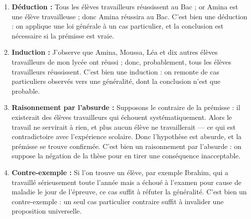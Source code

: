 \documentclass[11pt]{article}
\begin{document}
\begin{corrige}
\begin{enumerate}
\item \textbf{Déduction :} Tous les élèves travailleurs réussissent au Bac ; or Amina est une élève travailleuse ; donc Amina réussira au Bac. C'est bien une déduction : on applique une loi générale à un cas particulier, et la conclusion est nécessaire si la prémisse est vraie.
\item \textbf{Induction :} J'observe que Amina, Moussa, Léa et dix autres élèves travailleurs de mon lycée ont réussi ; donc, probablement, tous les élèves travailleurs réussissent. C'est bien une induction : on remonte de cas particuliers observés vers une généralité, dont la conclusion n'est que probable.
\item \textbf{Raisonnement par l'absurde :} Supposons le contraire de la prémisse : il existerait des élèves travailleurs qui échouent systématiquement. Alors le travail ne servirait à rien, et plus aucun élève ne travaillerait --- ce qui est contradictoire avec l'expérience scolaire. Donc l'hypothèse est absurde, et la prémisse se trouve confirmée. C'est bien un raisonnement par l'absurde : on suppose la négation de la thèse pour en tirer une conséquence inacceptable.
\item \textbf{Contre-exemple :} Si l'on trouve un élève, par exemple Ibrahim, qui a travaillé sérieusement toute l'année mais a échoué à l'examen pour cause de maladie le jour de l'épreuve, ce cas suffit à réfuter la généralité. C'est bien un contre-exemple : un seul cas particulier contraire suffit à invalider une proposition universelle.
\end{enumerate}
\end{corrige}
\end{document}
